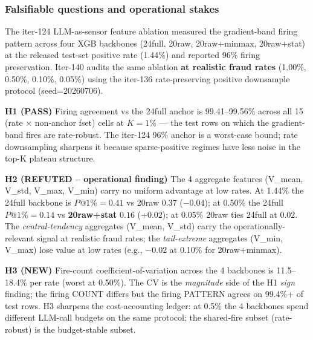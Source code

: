 
\subsubsection{Falsifiable questions and operational stakes}
The iter-124 LLM-as-sensor feature ablation measured the gradient-band
firing pattern across four XGB backbones (24full, 20raw,
20raw+minmax, 20raw+stat) at the released test-set positive rate
(1.44\%) and reported 96\% firing preservation.  Iter-140 audits
the same ablation \textbf{at realistic fraud rates} (1.00\%, 0.50\%,
0.10\%, 0.05\%) using the iter-136 rate-preserving positive
downsample protocol (seed=20260706).

\textbf{H1 (PASS)} Firing agreement vs the 24full anchor is 99.41--99.56\%
across all 15 (rate $\times$ non-anchor fset) cells at $K{=}1\%$ ---
the test rows on which the gradient-band fires are rate-robust.  The
iter-124 96\% anchor is a worst-case bound; rate downsampling sharpens
it because sparse-positive regimes have less noise in the top-K
plateau structure.

\textbf{H2 (REFUTED -- operational finding)} The 4 aggregate
features (V\_mean, V\_std, V\_max, V\_min) carry no uniform
advantage at low rates.  At 1.44\% the 24full backbone is
$P@1\%{=}0.41$ vs 20raw $0.37$ ($-0.04$); at 0.50\% the 24full
$P@1\%{=}0.14$ vs \textbf{20raw+stat} $0.16$ ($+0.02$); at 0.05\%
20raw ties 24full at $0.02$.  The \textit{central-tendency} aggregates
(V\_mean, V\_std) carry the operationally-relevant signal at realistic
fraud rates; the \textit{tail-extreme} aggregates (V\_min, V\_max)
lose value at low rates (e.g., $-0.02$ at 0.10\% for 20raw+minmax).

\textbf{H3 (NEW)} Fire-count coefficient-of-variation across the 4
backbones is 11.5--18.4\% per rate (worst at 0.50\%).  The CV is the
\emph{magnitude} side of the H1 \emph{sign} finding; the firing
COUNT differs but the firing PATTERN agrees on 99.4\%+ of test rows.
H3 sharpens the cost-accounting ledger: at 0.5\% the 4 backbones
spend different LLM-call budgets on the same protocol; the
shared-fire subset (rate-robust) is the budget-stable subset.

